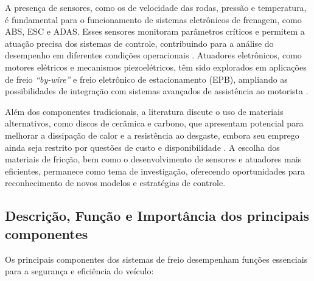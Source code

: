 A presença de sensores, como os de velocidade das rodas, pressão e temperatura, é fundamental para o funcionamento de sistemas eletrônicos de frenagem, como ABS, ESC e ADAS. Esses sensores monitoram parâmetros críticos e permitem a atuação precisa dos sistemas de controle, contribuindo para a análise do desempenho em diferentes condições operacionais \cite{Konrad2014, Lentin2022}. Atuadores eletrônicos, como motores elétricos e mecanismos piezoelétricos, têm sido explorados em aplicações de freio \textit{“by-wire”} e freio eletrônico de estacionamento (EPB), ampliando as possibilidades de integração com sistemas avançados de assistência ao motorista \cite{HouhuaJingShihao2023}.

Além dos componentes tradicionais, a literatura discute o uso de materiais alternativos, como discos de cerâmica e carbono, que apresentam potencial para melhorar a dissipação de calor e a resistência ao desgaste, embora seu emprego ainda seja restrito por questões de custo e disponibilidade \cite{Lentin2022}. A escolha dos materiais de fricção, bem como o desenvolvimento de sensores e atuadores mais eficientes, permanece como tema de investigação, oferecendo oportunidades para reconhecimento de novos modelos e estratégias de controle.

\subsection{Descrição, Função e Importância dos principais componentes }
\label{sec:o-estado-da-arte-3-1}
Os principais componentes dos sistemas de freio desempenham funções essenciais para a segurança e eficiência do veículo:

